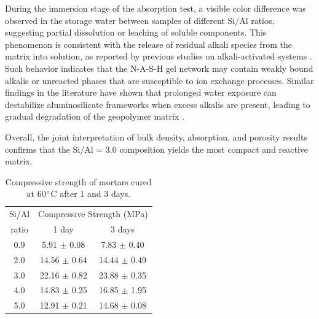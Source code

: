 During the immersion stage of the absorption test, a visible color difference was observed in the storage water between samples of different Si/Al ratios, suggesting partial dissolution or leaching of soluble components.
This phenomenon is consistent with the release of residual alkali species from the matrix into solution, as reported by previous studies on alkali-activated systems \cite{pachecotorgal2014handbook}.
Such behavior indicates that the N-A-S-H gel network may contain weakly bound alkalis or unreacted phases that are susceptible to ion exchange processes.
Similar findings in the literature have shown that prolonged water exposure can destabilize aluminosilicate frameworks when excess alkalis are present, leading to gradual degradation of the geopolymer matrix \cite{Brito2008}.

Overall, the joint interpretation of bulk density, absorption, and porosity results confirms that the Si/Al = 3.0 composition yields the most compact and reactive matrix.

\begin{table}[H]
  \centering
  \caption{Compressive strength of mortars cured at 60$^{\circ}$C after 1 and 3 days.}
  \label{tab:compressive_strength_combined}
  \begin{tabular}{ccc}
  \hline
  {Si/Al} & \multicolumn{2}{c}{Compressive Strength (MPa)} \\
  \cline{2-3}
  ratio & 1 day & 3 days \\
  \hline
  0.9 & 5.91 $\pm$ 0.08 & 7.83 $\pm$ 0.40 \\
  2.0 & 14.56 $\pm$ 0.64 & 14.44 $\pm$ 0.49 \\
  3.0 & 22.16 $\pm$ 0.82 & 23.88 $\pm$ 0.35 \\
  4.0 & 14.83 $\pm$ 0.25 & 16.85 $\pm$ 1.95 \\
  5.0 & 12.91 $\pm$ 0.21 & 14.68 $\pm$ 0.08 \\
  \hline
  \end{tabular}
\end{table}

